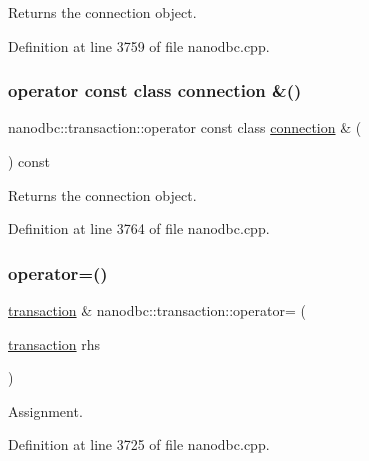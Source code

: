 Returns the connection object. 



Definition at line 3759 of file nanodbc.\+cpp.

\mbox{\label{classnanodbc_1_1transaction_ae2f6e59ea672314d66b5107f55b91e24}} 
\subsubsection{\texorpdfstring{operator const class connection \&()}{operator const class connection \&()}}
{\footnotesize\ttfamily nanodbc\+::transaction\+::operator const class \mbox{\hyperlink{classnanodbc_1_1connection}{connection}} \& (\begin{DoxyParamCaption}{ }\end{DoxyParamCaption}) const}



Returns the connection object. 



Definition at line 3764 of file nanodbc.\+cpp.

\mbox{\label{classnanodbc_1_1transaction_a584efaaafeb6e5246db46a45f9ce2e31}} 
\subsubsection{\texorpdfstring{operator=()}{operator=()}}
{\footnotesize\ttfamily \mbox{\hyperlink{classnanodbc_1_1transaction}{transaction}} \& nanodbc\+::transaction\+::operator= (\begin{DoxyParamCaption}\item[{\mbox{\hyperlink{classnanodbc_1_1transaction}{transaction}}}]{rhs }\end{DoxyParamCaption})}



Assignment. 



Definition at line 3725 of file nanodbc.\+cpp.

\mbox{\label{classnanodbc_1_1transaction_a078907315633af2569fc3bbcc70461e8}} 
